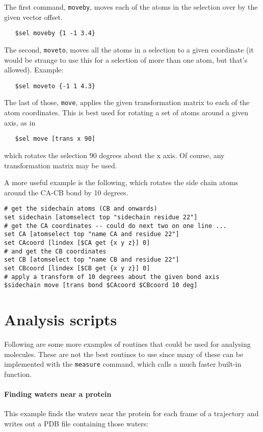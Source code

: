 The first command, {\tt moveby}, moves each of the atoms in the
selection over by the given vector offset.
\begin{verbatim}
   $sel moveby {1 -1 3.4}
\end{verbatim}
The second, {\tt moveto}, moves all the atoms in a selection to a
given coordinate (it would be strange to use this for a selection of
more than one atom, but that's allowed).  Example:
\begin{verbatim}
   $sel moveto {-1 1 4.3}
\end{verbatim}
  The last of those, {\tt move}, applies the given transformation
matrix to each of the atom coordinates.  This is best used for
rotating a set of atoms around a given axis, as in
\begin{verbatim}
   $sel move [trans x 90]
\end{verbatim}
which rotates the selection 90 degrees about the x axis.  Of course,
any transformation matrix may be used.

 A more useful
example is the following, which rotates the side chain atoms around
the CA-CB bond by 10 degrees. 
\begin{verbatim}
# get the sidechain atoms (CB and onwards)
set sidechain [atomselect top "sidechain residue 22"]
# get the CA coordinates -- could do next two on one line ...
set CA [atomselect top "name CA and residue 22"]
set CAcoord [lindex [$CA get {x y z}] 0]
# and get the CB coordinates
set CB [atomselect top "name CB and residue 22"]
set CBcoord [lindex [$CB get {x y z}] 0]
# apply a transform of 10 degrees about the given bond axis
$sidechain move [trans bond $CAcoord $CBcoord 10 deg]
\end{verbatim}


\section{Analysis scripts}
Following are some more examples of routines that could be used for analysing
molecules.  These are not the best routines to use since many of these can be
implemented with the {\tt measure} command, which calls a much faster built-in
function. 

\paragraph{Finding waters near a protein}
This example finds the waters near the protein for each frame of a trajectory
and writes out a PDB file containing those waters:

